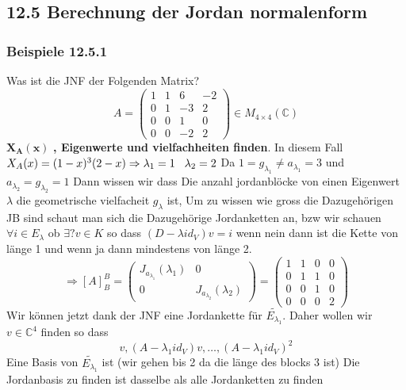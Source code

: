 \documentclass{article}
\newcommand{\smspc}{\hspace{0.3cm}}
\newcommand{\beispiel}[1]{\subsubsection*{Beispiele {#1}}}
\begin{document}
\subsection*{12.5 Berechnung der Jordan normalenform}
\beispiel{12.5.1} Was ist die JNF der Folgenden Matrix?\[A=\begin{pmatrix}1&1&6&-2\\0&1&-3&2\\0&0&1&0\\0&0&-2&2\end{pmatrix}\in M_{4\times4}(\mathbb{C})\]
$\mathbf{X_A(x)}$ \textbf{, Eigenwerte und vielfachheiten finden}. In diesem Fall $X_A(x)= (1-x)^3(2-x)\Rightarrow \lambda_1=1\smspc\lambda_2=2$ Da $1=g_{\lambda_1}\neq a_{\lambda_1}=3$
und $a_{\lambda_2}=g_{\lambda_2}=1$ Dann wissen wir dass Die anzahl jordanblöcke von einen Eigenwert $\lambda$ die geometrische vielfacheit $g_\lambda$ ist, Um zu wissen wie gross die Dazugehörigen JB sind schaut man sich die Dazugehörige Jordanketten an, bzw wir schauen $\forall i\in E_\lambda$ ob $\exists?v\in K$ so dass $(D-\lambda id_V)v=i$ wenn nein dann ist die Kette von länge 1 und wenn ja dann mindestens von länge 2. \[\Rightarrow[A]_B^B=\begin{pmatrix}J_{a_{\lambda_1}}(\lambda_1)&0\\0&J_{a_{\lambda_2}}(\lambda_2)\end{pmatrix}=\begin{pmatrix}1&1&0&0\\0&1&1&0\\0&0&1&0\\0&0&0&2\end{pmatrix}\]
Wir können jetzt dank der JNF eine Jordankette für $\tilde{E_{\lambda_1}}$. Daher wollen wir $v\in \mathbb{C}^4$ finden so dass \[v, (A-\lambda_1 id_V)v, \hdots , (A-\lambda_1 id_V)^2\] Eine Basis von $\tilde{E_{\lambda_1}}$ ist (wir gehen bis 2 da die länge des blocks 3 ist)
Die Jordanbasis zu finden ist dasselbe als alle Jordanketten zu finden
\end{document}
